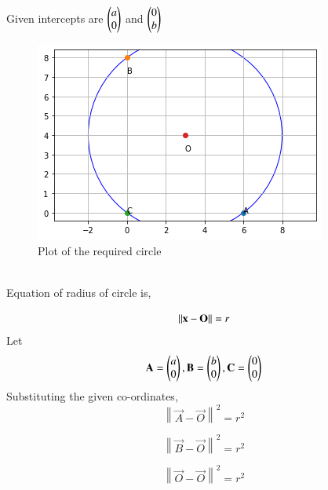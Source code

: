 \documentclass[journal,12pt,twocolumn]{IEEEtran}
\begin{document}
Given intercepts are $\begin{pmatrix}a\\0\end{pmatrix}$ and $\begin{pmatrix}0\\b\end{pmatrix}$ \\
\begin{figure}[!h]
         \centering
         \includegraphics[width=\columnwidth]{figure3.png}
         \caption{Plot of the required circle}
         \label{Figure}
\end{figure}\\
Equation of radius of circle is,

\begin{equation}
   \lVert\mathbf{x}-\mathbf{O}\rVert=r
\end{equation}
Let 
\begin{equation}
 \mathbf{A}=\begin{pmatrix}a\\0\end{pmatrix} ,\\
 \mathbf{B}=\begin{pmatrix}b\\0\end{pmatrix},\\
 \mathbf{C}=\begin{pmatrix}0\\0\end{pmatrix}
\end{equation}
Substituting the given co-ordinates,
\begin{equation}
\left\lVert {\vec{A}-\vec{O}}\right\rVert^2=r^2 \label{eq:1}
\end{equation}


 \begin{equation}
\left\lVert {\vec{B}-\vec{O}}\right\rVert^2=r^2 \label{eq:2}
\end{equation}



\begin{equation}
\left\lVert {\vec{O}-\vec{O}}\right\rVert^2=r^2 \label{eq:3}
\end{equation}
\end{document}
